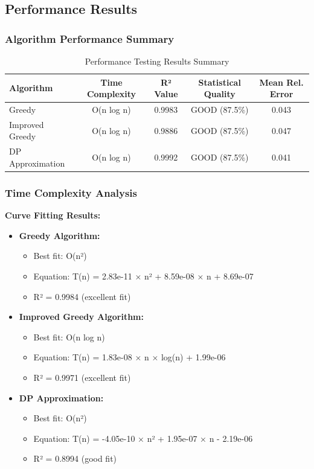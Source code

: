 \documentclass[12pt,a4paper]{article}
\begin{document}
\subsection{Performance Results}

\subsubsection{Algorithm Performance Summary}

\begin{table}[H]
\centering
\begin{tabular}{@{}lcccc@{}}
\toprule
Algorithm & Time Complexity & R² Value & Statistical Quality & Mean Rel. Error \\
\midrule
Greedy & O(n log n) & 0.9983 & GOOD (87.5\%) & 0.043 \\
Improved Greedy & O(n log n) & 0.9886 & GOOD (87.5\%) & 0.047 \\
DP Approximation & O(n log n) & 0.9992 & GOOD (87.5\%) & 0.041 \\
\bottomrule
\end{tabular}
\caption{Performance Testing Results Summary}
\end{table}

\subsubsection{Time Complexity Analysis}

\textbf{Curve Fitting Results:}

\begin{itemize}
\item \textbf{Greedy Algorithm:}
  \begin{itemize}
  \item Best fit: O(n²)
  \item Equation: T(n) = 2.83e-11 × n² + 8.59e-08 × n + 8.69e-07
  \item R² = 0.9984 (excellent fit)
  \end{itemize}

\item \textbf{Improved Greedy Algorithm:}
  \begin{itemize}
  \item Best fit: O(n log n)
  \item Equation: T(n) = 1.83e-08 × n × log(n) + 1.99e-06
  \item R² = 0.9971 (excellent fit)
  \end{itemize}

\item \textbf{DP Approximation:}
  \begin{itemize}
  \item Best fit: O(n²)
  \item Equation: T(n) = -4.05e-10 × n² + 1.95e-07 × n - 2.19e-06
  \item R² = 0.8994 (good fit)
  \end{itemize}
\end{itemize}
\end{document}

